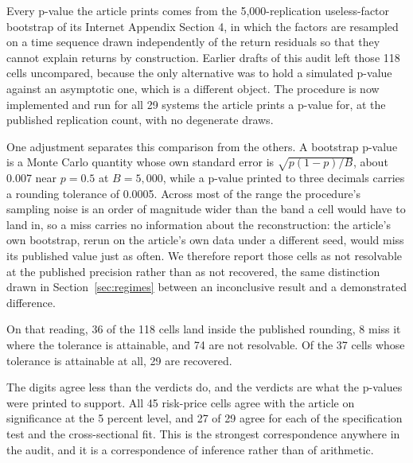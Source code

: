 \documentclass[11pt]{article}
\begin{document}
Every p-value the article prints comes from the 5,000-replication useless-factor %
bootstrap of its Internet Appendix Section 4, in which the factors are resampled %
on a time sequence drawn independently of the return residuals so that they
cannot explain returns by construction. Earlier drafts of this audit left those
118 cells uncompared, because the only alternative was to hold a simulated %
p-value against an asymptotic one, which is a different object. The procedure is
now implemented and run for all 29 systems the article prints a p-value for, at %
the published replication count, with no degenerate draws. %

One adjustment separates this comparison from the others. A bootstrap p-value is
a Monte Carlo quantity whose own standard error is $\sqrt{p(1-p)/B}$, about %
0.007 near $p=0.5$ at $B=5{,}000$, while a p-value printed to three decimals %
carries a rounding tolerance of 0.0005. Across most of the range the procedure's %
sampling noise is an order of magnitude wider than the band a cell would have to
land in, so a miss carries no information about the reconstruction: the article's
own bootstrap, rerun on the article's own data under a different seed, would miss
its published value just as often. We therefore report those cells as not
resolvable at the published precision rather than as not recovered, the same
distinction drawn in Section~\ref{sec:regimes} between an inconclusive result and
a demonstrated difference.

On that reading, 36 of the 118 cells land inside the published rounding, 8 miss %
it where the tolerance is attainable, and 74 are not resolvable. Of the 37 cells %
whose tolerance is attainable at all, 29 are recovered. %

The digits agree less than the verdicts do, and the verdicts are what the
p-values were printed to support. All 45 risk-price cells agree with the article %
on significance at the 5 percent level, and 27 of 29 agree for each of the %
specification test and the cross-sectional fit. This is the strongest %
correspondence anywhere in the audit, and it is a correspondence of inference
rather than of arithmetic.
\end{document}
